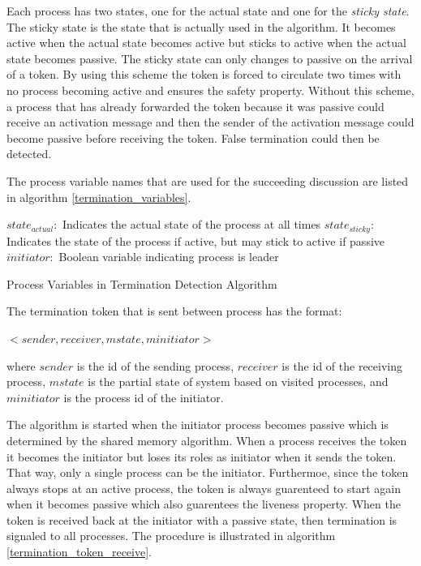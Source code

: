 \documentclass[11pt]{book}
\begin{document}
Each process has two states, one for the actual state and one for the \emph{sticky state}.
The sticky state is the state that is actually used in the algorithm. It becomes active
when the actual state becomes active but sticks to active when the actual state becomes
passive. The sticky state can only changes to passive on the arrival of a token. By using
this scheme the token is forced to circulate two times with no process becoming active and
ensures the safety property. Without this scheme, a process that has already forwarded the
token because it was passive could receive an activation message and then the sender of the
activation message could become passive before receiving the token. False termination could
then be detected.

The process variable names that are used for the succeeding discussion are listed in
algorithm \ref{termination_variables}.

\begin{algorithm}
\DontPrintSemicolon
    \boldmath$state_{actual}:$ Indicates the actual state of the process at all times\;
    \boldmath$state_{sticky}:$ Indicates the state of the process if active, but may stick
        to active if passive\;
    \boldmath$initiator:$ Boolean variable indicating process is leader\;
\caption{Process Variables in Termination Detection Algorithm}\label{termination_variables}
\end{algorithm}

\noindent
The termination token that is sent between process has the format:

    $<sender, receiver, mstate, minitiator>$

\noindent
where $sender$ is the id of the sending process, $receiver$ is the id of the receiving
process, $mstate$ is the partial state of system based on visited processes, and $minitiator$
is the process id of the initiator.

The algorithm is started when the initiator process becomes passive which is determined by
the shared memory algorithm. When a process receives the token it becomes the initiator
but loses its roles as initiator when it sends the token. That way, only a single process
can be the initiator. Furthermoe, since the token always stops at an active process, the
token is always guarenteed to start again when it becomes passive which also guarentees
the liveness property. When the token is received back at the initiator with a passive
state, then termination is signaled to all processes. The procedure is illustrated in
algorithm \ref{termination_token_receive}.
\end{document}
